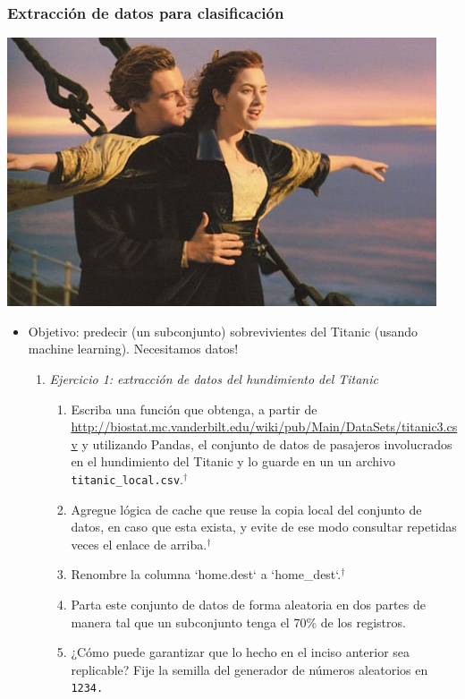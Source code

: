 \documentclass[leqno, 10pt, envcountsect]{beamer}
\numberwithin{equation}{section}
\theoremstyle{definition}
\theoremstyle{example}
\numberwithin{figure}{section}
\numberwithin{table}{section}
\let\olditem\item
\renewcommand{\item}{%
\olditem\vspace{1pt}}
\begin{document}
\begin{frame}[fragile=singleslide]
  \frametitle{Extracción de datos para clasificación}
  \begin{center}
    \includegraphics[scale=0.33]{titanic.jpg}
  \end{center}
  \begin{itemize}
    \item Objetivo: predecir (un subconjunto) sobrevivientes del Titanic (usando machine
      learning). Necesitamos datos!
      \begin{enumerate}
            \item \textit{Ejercicio 1: extracción de datos del hundimiento del Titanic}
              \begin{enumerate}
                \item Escriba una función que obtenga, a partir de
                  \href{http://biostat.mc.vanderbilt.edu/wiki/pub/Main/DataSets/titanic3.csv}{http://biostat.mc.vanderbilt.edu/wiki/pub/Main/DataSets/titanic3.csv} y utilizando Pandas, el conjunto de datos de pasajeros
                  involucrados en el hundimiento del Titanic y lo guarde en un
                  un archivo \texttt{titanic_local.csv}.$^{\dag}$
                \item Agregue lógica de cache que reuse la copia local del
                  conjunto de datos, en caso que esta exista, y evite de ese
                  modo consultar repetidas veces el enlace de arriba.$^{\dag}$
                \item Renombre la columna `home.dest` a `home\_dest`.$^{\dag}$
                \item Parta este conjunto de datos de forma aleatoria en dos
                  partes de manera tal que un subconjunto tenga el 70\% de los
                  registros.
                \item ¿Cómo puede garantizar que lo hecho en el inciso anterior
                  sea replicable?  Fije la semilla del generador de números
                  aleatorios en \texttt{1234.}
              \end{enumerate}
        \end{enumerate}
  \end{itemize}
\end{frame}
\end{document}
